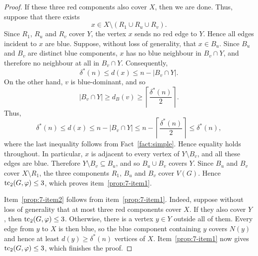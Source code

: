 \documentclass[10pt,a4paper]{amsart}
\def\tc{\mathop{\text{\rm tc}}\nolimits}
\begin{document}
\begin{proof}
If these three red components also cover $X$, then we are done. Thus, suppose
that there exists
\[
    x\in X\setminus (R_1\cup R_u\cup R_v).
\]
Since $R_1$, $R_u$ and $R_v$ cover $Y$, the vertex $x$ sends no red edge to
$Y$. Hence all edges incident to $x$ are blue. Suppose, without loss of
generality, that $x\in B_u$. Since $B_u$ and $B_v$ are distinct blue components,
$x$ has no blue neighbour in $B_v\cap Y$, and therefore no neighbour at all in
$B_v\cap Y$. Consequently,
\[
    \delta^*(n) \le d(x) \le n-|B_v\cap Y|.
\]
On the other hand, $v$ is blue-dominant, and so
\[
    |B_v\cap Y| \ge d_B(v) \ge \left\lceil \frac{\delta^*(n)}{2}\right\rceil.
\]
Thus,
\[
    \delta^*(n) \le d(x) \le n-|B_v\cap Y|
        \le n-\left\lceil \frac{\delta^*(n)}{2}\right\rceil
        \le \delta^*(n),
\]
where the last inequality follows from Fact~\ref{fact:simple}. Hence equality
holds throughout. In particular, $x$ is adjacent to every vertex of $Y\setminus
B_v$, and all these edges are blue. Therefore $Y\setminus B_v\subseteq B_u$, and
so $B_u\cup B_v$ covers $Y$. Since $B_u$ and $B_v$ cover $X\setminus R_1$, the
three components $R_1$, $B_u$ and $B_v$ cover $V(G)$. Hence $\tc_2(G,\varphi)\le
3$, which proves item~\ref{prop:7-item1}.

Item~\ref{prop:7-item2} follows from item~\ref{prop:7-item1}. Indeed, suppose
without loss of generality that at most three red components cover
$X$. If they also cover $Y$, then $\tc_2(G,\varphi)\le 3$. Otherwise, there is a vertex
$y\in Y$ outside all of them. Every edge from $y$ to $X$ is then blue, so the
blue component containing $y$ covers $N(y)$ and hence at least
$d(y)\ge \delta^*(n)$ vertices of $X$. Item~\ref{prop:7-item1} now gives
$\tc_2(G,\varphi)\le 3$, which finishes the proof.
\end{proof}
\end{document}
